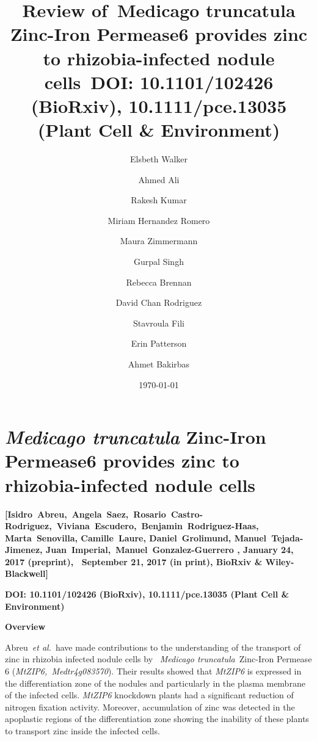 \documentclass[10pt]{article}
\begin{document}
\title{Review of~Medicago truncatula Zinc-Iron Permease6 provides zinc to
rhizobia-infected nodule cells~DOI: 10.1101/102426 (BioRxiv),
10.1111/pce.13035 (Plant Cell \& Environment)}



\author[1]{Elsbeth Walker}%
\author[1]{Ahmed Ali}%
\author[1]{Rakesh Kumar}%
\author[1]{Miriam Hernandez Romero}%
\author[1]{Maura Zimmermann}%
\author[1]{Gurpal Singh}%
\author[1]{Rebecca Brennan}%
\author[1]{David Chan Rodriguez}%
\author[1]{Stavroula Fili}%
\author[1]{Erin Patterson}%
\author[1]{Ahmet Bakirbas}%
%


\vspace{-1em}



  \date{\today}


\begingroup
\let\center\flushleft
\let\endcenter\endflushleft
\maketitle
\endgroup









\section*{\texorpdfstring{\emph{Medicago truncatula} Zinc-Iron Permease6
provides zinc to rhizobia-infected nodule
cells}{Medicago truncatula Zinc-Iron Permease6 provides zinc to rhizobia-infected nodule cells}}

{\label{463319}}

\textbf{{[}Isidro~Abreu,~Angela~Saez,~Rosario~Castro-Rodriguez,~Viviana~Escudero,~Benjamin~Rodriguez-Haas,~
Marta~Senovilla, Camille~Laure, Daniel~Grolimund, Manuel~Tejada-Jimenez,
Juan~Imperial,~Manuel~Gonzalez-Guerrero , January 24, 2017 (preprint),~
September 21, 2017 (in print), BioRxiv \& Wiley-Blackwell{]}}

\textbf{DOI: 10.1101/102426 (BioRxiv), 10.1111/pce.13035 (Plant Cell \&
Environment)}

\par\null

\textbf{Overview}

\par\null

Abreu~\emph{et al.}~have made contributions to the understanding of the
transport of zinc in rhizobia infected nodule cells by~ \emph{Medicago
truncatula~}Zinc-Iron Permease 6 (\emph{MtZIP6,~Medtr4g083570}). Their
results showed that \emph{MtZIP6} is expressed in the differentiation
zone of the nodules and particularly in the plasma membrane of the
infected cells. \emph{MtZIP6} knockdown plants had a significant
reduction of nitrogen fixation activity. Moreover, accumulation of zinc
was detected in the apoplastic regions of the differentiation zone
showing the inability of these plants to transport zinc inside the
infected cells.
\end{document}
